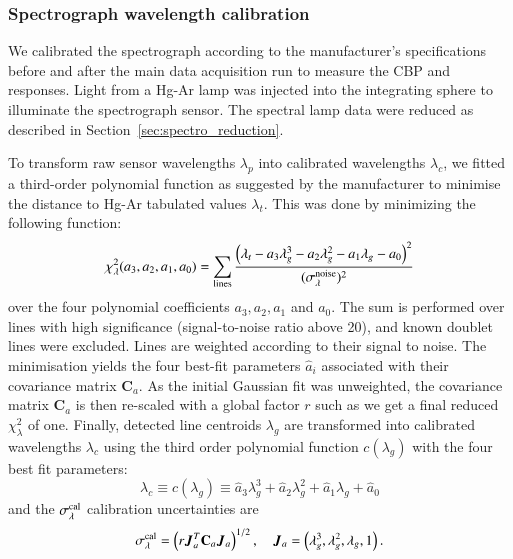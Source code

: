 \subsubsection{Spectrograph wavelength calibration}

We calibrated the spectrograph according to the manufacturer's specifications before and after the main data acquisition run to measure the CBP and \SD responses. Light from a Hg-Ar lamp was injected into the integrating sphere to illuminate the spectrograph sensor. The spectral lamp data were reduced as described in Section~\ref{sec:spectro_reduction}.




To transform raw sensor wavelengths $\lambda_p$ into calibrated wavelengths $\lambda_c$, we fitted a third-order polynomial function as suggested by the manufacturer to minimise the distance to Hg-Ar tabulated values $\lambda_t$. This was done by minimizing the following function: 
\begin{equation}
    \chi_\lambda^2(a_3, a_2, a_1, a_0) = \sum_{\text{lines}} \frac{\left(\lambda_t-a_3 \lambda_g^3 - a_2 \lambda_g^2-a_1 \lambda_g -a_0\right)^2}{(\sigma_\lambda^{\rm noise})^2}
\end{equation}
over the four polynomial coefficients $a_3, a_2, a_1$ and $a_0$. The sum is performed over lines with high significance (signal-to-noise ratio above 20), and known doublet lines were excluded. Lines are weighted according to their signal to noise. The minimisation yields the four best-fit parameters $\hat a_i$ associated with their covariance matrix $\mathbf{C}_a$. 
As the initial Gaussian fit was unweighted, the covariance matrix $\mathbf{C}_a$ is then re-scaled with a global factor $r$ such as we get a final reduced $\chi_\lambda^2$ of one. 
Finally, detected line centroids $\lambda_g$ are transformed into calibrated wavelengths $\lambda_c$ using the third order polynomial function $c(\lambda_g)$ with the four best fit parameters:  
\begin{equation}
    \lambda_c \equiv c(\lambda_g) \equiv \hat a_3 \lambda_g^3 + \hat a_2 \lambda_g^2+\hat a_1 \lambda_g +\hat a_0
\end{equation}
and the $\sigma_\lambda^{\rm cal}$ calibration uncertainties are
\begin{equation}
    \sigma_\lambda^{\rm cal} = \left(r\vec J_a^T \mathbf{C}_a \vec J_a\right)^{1/2},\quad \vec J_a = \left(\lambda_g^3, \lambda_g^2, \lambda_g, 1\right).
\end{equation}

